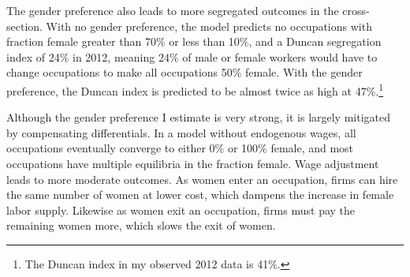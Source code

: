 \documentclass[11pt]{article}
\begin{document}



The gender preference also leads to more segregated outcomes in the cross-section. With no gender preference, the model predicts no occupations with fraction female greater than 70\% or less than 10\%, and a Duncan segregation index of 24\% in 2012, meaning 24\% of male or female workers would have to change occupations to make all occupations 50\% female. With the gender preference, the Duncan index is predicted to be almost twice as high at 47\%.\footnote{The Duncan index in my observed 2012 data is 41\%.}





Although the gender preference I estimate is very strong, it is largely mitigated by compensating differentials. In a model without endogenous wages, all occupations eventually converge to either 0\% or 100\% female, and most occupations have multiple equilibria in the fraction female. Wage adjustment leads to more moderate outcomes. As women enter an occupation, firms can hire the same number of women at lower cost, which dampens the increase in female labor supply. Likewise as women exit an occupation, firms must pay the remaining women more, which slows the exit of women. 






\end{document}
